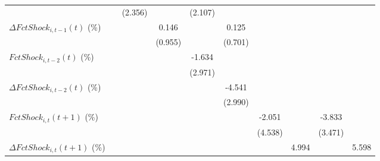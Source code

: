 {\begin{tabular}{l*{9}{c}}
                    &                     &     (2.356)         &                     &     (2.107)         &                     &                     &                     &                     &                     \\
\addlinespace
$ \Delta FctShock_{i,t-1}(t)$ (\%)&                     &                     &       0.146         &                     &       0.125         &                     &                     &                     &                     \\
                    &                     &                     &     (0.955)         &                     &     (0.701)         &                     &                     &                     &                     \\
\addlinespace
$ FctShock_{i,t-2}(t)$ (\%)&                     &                     &                     &      -1.634         &                     &                     &                     &                     &                     \\
                    &                     &                     &                     &     (2.971)         &                     &                     &                     &                     &                     \\
\addlinespace
$ \Delta FctShock_{i,t-2}(t)$ (\%)&                     &                     &                     &                     &      -4.541         &                     &                     &                     &                     \\
                    &                     &                     &                     &                     &     (2.990)         &                     &                     &                     &                     \\
\addlinespace
$ FctShock_{i,t}(t+1)$ (\%)&                     &                     &                     &                     &                     &      -2.051         &                     &      -3.833         &                     \\
                    &                     &                     &                     &                     &                     &     (4.538)         &                     &     (3.471)         &                     \\
\addlinespace
$ \Delta FctShock_{i,t}(t+1)$ (\%)&                     &                     &                     &                     &                     &                     &       4.994         &                     &       5.598         \\

\end{tabular}}
